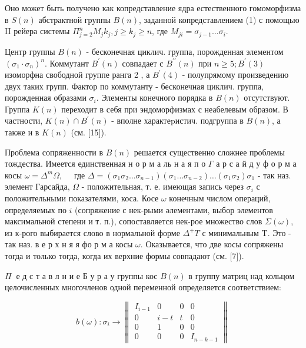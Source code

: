 \documentclass[10pt]{article}
\begin{document}
Оно может быть получено как копредставление ядра естественного гомоморфизма в $S(n)$ абстрактной группы $B(n)$, заданной копредставлением (1) с помощью II рейера системы $\Pi_{j=2}^{n} M_{j} k_{j}, j \geqslant k_{j} \geqslant n$, где $M_{j i}=\sigma_{j-1} \ldots \sigma_{i}$.



Центр группы $B(n)$ - бесконечная циклич. группа, порожденная элементом $\left(\sigma_{1} \cdot \sigma_{n}\right)^{n}$. Коммутант $B^{\prime}(n)$ совпадает с $B^{\prime \prime}(n)$ при $n \geqslant 5 ; B^{\prime}(3)$ изоморфна свободной группе ранга 2 , а $B^{\prime}(4)$ - полупрямому произведению двух таких групп. Фактор по коммутанту - бесконечная циклич. группа, порожденная образами $\sigma_{i}$. Элементы конечного порядка в $B(n)$ отсутствуют. Группа $K(n)$ переходит в себя при эндоморфизмах с неабелевым образом. В частности, $K(n) \cap B^{\prime}(n)$ - вполне характеpистич. подгруппа в $B(n)$, а также и в $K(n)$ (см. [15]).



Проблема сопряженности в $B(n)$ решается существенно сложнее проблемы тождества. Имеется единственная н о р м а ль н а я п о $\Gamma$ а р с а й д у ф о р м а косы $\omega=\Delta^{m} \Omega, \quad$ где $\Delta=\left(\sigma_{1} \sigma_{2} \ldots \sigma_{n-1}\right)\left(\sigma_{1} \ldots \sigma_{n-2}\right) \ldots\left(\sigma_{1} \sigma_{2}\right) \sigma_{1}$ - так наз. элемент Гарсайда, $\Omega$ - положительная, т. е. имеющая запись через $\sigma_{i}$ с положительными показателями, коса. Косе $\omega$ конечным числом операций, определяемых по $i$ (сопряжение с нек-рыми әлементами, выбор элементов максимальной степени и т. п.), сопоставляется нек-рое множество слов $\Sigma(\omega)$, из к-рого выбирается слово в нормальной форме $\Delta^{+} T$ с минимальным T. Это - так наз. в е р х н я я фо р м а косы $\omega$. Оказывается, что две косы сопряжены тогда и только тогда, когда их верхние формы совпадают (см. [7]).



$\Pi \mathbf{~}$ е д с т а в л н и е Б у р а у группы кос $B(n)$ в группу матриц над кольцом целочисленных многочленов одной переменной определяется соответствием:



\[

b(\omega): \sigma_{i} \rightarrow\left\|\begin{array}{cccc}

I_{i-1} & 0 & 0 & 0 \\

0 & i-t & t & 0 \\

0 & 1 & 0 & 0 \\

0 & 0 & 0 & I_{n-k-1}

\end{array}\right\|

\]
\end{document}
